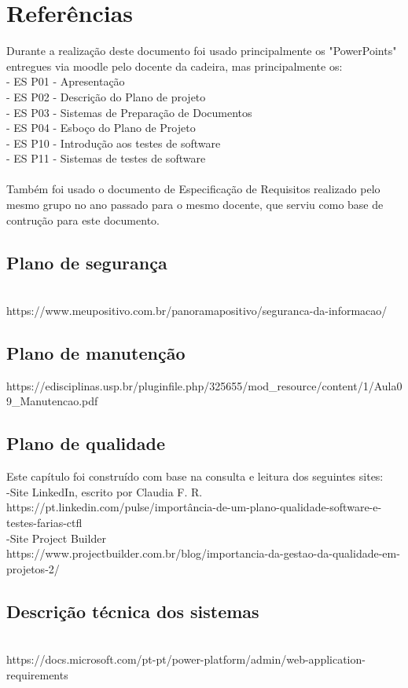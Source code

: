 \chapter{Referências}
\label{referencias}
Durante a realização deste documento foi usado principalmente os "PowerPoints" entregues via moodle pelo docente da cadeira, mas principalmente os:\\
- ES P01 - Apresentação\\
- ES P02 - Descrição do Plano de projeto\\
- ES P03 - Sistemas de Preparação de Documentos\\
- ES P04 - Esboço do Plano de Projeto\\
- ES P10 - Introdução aos testes de software\\
- ES P11 - Sistemas de testes de software\\
\\
Também foi usado o documento de Especificação de Requisitos realizado pelo mesmo grupo no ano passado para o mesmo docente, que serviu como base de contrução para este documento.\\

\section{Plano de segurança}
\\
https://www.meupositivo.com.br/panoramapositivo/seguranca-da-informacao/ 

\section{Plano de manutenção}
https://edisciplinas.usp.br/pluginfile.php/325655/mod_resource/content/1/Aula09_Manutencao.pdf

\section{Plano de qualidade}
Este capítulo foi construído com base na consulta e leitura dos seguintes sites:\\
-Site LinkedIn, escrito por Claudia F. R. \\
https://pt.linkedin.com/pulse/importância-de-um-plano-qualidade-software-e-testes-farias-ctfl 
\\
-Site Project Builder\\
https://www.projectbuilder.com.br/blog/importancia-da-gestao-da-qualidade-em-projetos-2/

\section{Descrição técnica dos sistemas}
\\
https://docs.microsoft.com/pt-pt/power-platform/admin/web-application-requirements

